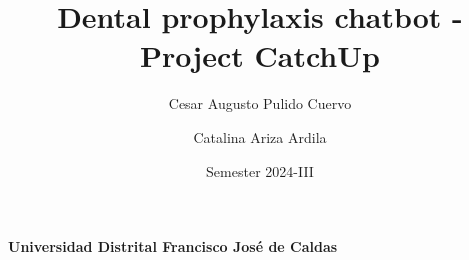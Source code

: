 \documentclass[12pt]{article}
\title{Dental prophylaxis chatbot - Project CatchUp}
\author{Cesar Augusto Pulido Cuervo \and Catalina Ariza Ardila}
\date{Semester 2024-III}
\begin{document}
\maketitle
\begin{center}
\textbf{Universidad Distrital Francisco José de Caldas}
\end{center}

\vspace{1cm}
\end{document}
